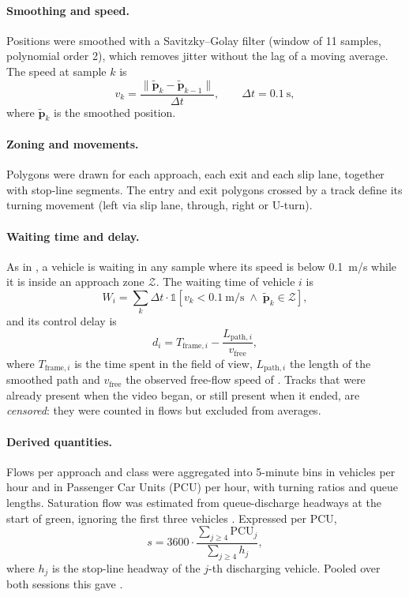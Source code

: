 \paragraph{Smoothing and speed.} Positions were smoothed with a Savitzky--Golay filter
\cite{savitzky1964} (window of 11 samples, polynomial order 2), which removes jitter without the lag of a moving average. The speed at sample $k$ is
\begin{equation}
  v_k = \frac{\lVert \tilde{\mathbf{p}}_k - \tilde{\mathbf{p}}_{k-1} \rVert}{\Delta t},
  \qquad \Delta t = 0.1~\text{s},
  \label{eq:impl-speed}
\end{equation}
where $\tilde{\mathbf{p}}_k$ is the smoothed position. 

\paragraph{Zoning and movements.} Polygons were drawn for each approach, each exit and each slip
lane, together with stop-line segments. The entry and exit polygons crossed by a track define its
turning movement (left via slip lane, through, right or U-turn).

\paragraph{Waiting time and delay.} As in \sumo{}, a vehicle is waiting in any sample where its speed is
below 0.1~m/s while it is inside an approach zone $\mathcal{Z}$. The waiting time of vehicle $i$ is
\begin{equation}
  W_i = \sum_{k} \Delta t \cdot \mathbb{1}\!\left[ v_k < 0.1~\text{m/s} \;\wedge\; \tilde{\mathbf{p}}_k \in \mathcal{Z} \right],
  \label{eq:impl-wait}
\end{equation}
and its control delay is
\begin{equation}
  d_i = T_{\text{frame},i} - \frac{L_{\text{path},i}}{v_{\text{free}}},
  \label{eq:impl-delay}
\end{equation}
where $T_{\text{frame},i}$ is the time spent in the field of view, $L_{\text{path},i}$ the length of the
smoothed path and $v_{\text{free}}$ the observed free-flow speed of . Tracks that were
already present when the video began, or still present when it ended, are \emph{censored}: they were counted in flows but excluded from averages.

\paragraph{Derived quantities.} Flows per approach and class were aggregated into 5-minute bins in
vehicles per hour and in Passenger Car Units (PCU) per hour,  with turning ratios and queue lengths. Saturation flow was estimated from queue-discharge headways
at the start of green, ignoring the first three vehicles
\cite{hcm2016}. Expressed per PCU,
\begin{equation}
  s = 3600 \cdot \frac{\sum_{j\geq4} \text{PCU}_j}{\sum_{j\geq4} h_j},
  \label{eq:impl-satflow}
\end{equation}
where $h_j$ is the stop-line headway of the $j$-th discharging vehicle. Pooled over both sessions this
gave .

